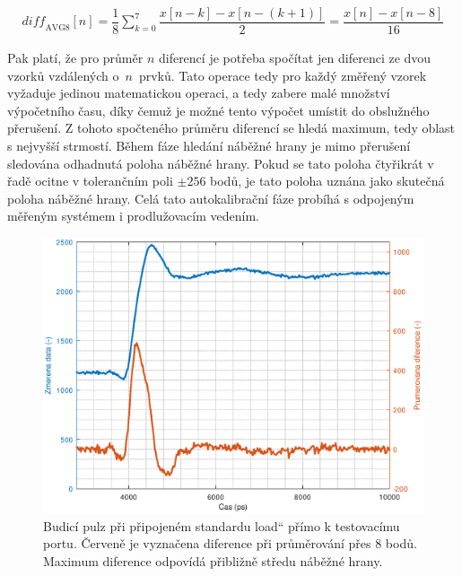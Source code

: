 \begin{equation}
\begin{gathered}
	\mathit{diff}_{\mathrm{AVG8}}[n]= \dfrac{1}{8} \sum_{k=0}^7 \dfrac{x[n-k]-x[n-(k+1)]}{2}= \dfrac{x[n]-x[n-8]}{16}
\end{gathered}
\label{equation_difference_sum}
\end{equation}

Pak platí, že pro průměr $n$ diferencí je potřeba spočítat jen diferenci ze dvou vzorků vzdálených o~$n$~prvků. Tato operace tedy pro každý změřený vzorek vyžaduje jedinou matematickou operaci, a tedy zabere malé množství výpočetního času, díky čemuž je možné tento výpočet umístit do obslužného přerušení. Z tohoto spočteného průměru diferencí se hledá maximum, tedy oblast s nejvyšší strmostí. Během fáze hledání náběžné hrany je mimo přerušení sledována odhadnutá poloha náběžné hrany. Pokud se tato poloha čtyřikrát v řadě ocitne v tolerančním poli $\pm256$ bodů, je tato poloha uznána jako skutečná poloha náběžné hrany. Celá tato autokalibrační fáze probíhá s odpojeným měřeným systémem i prodlužovacím vedením. 

\begin{figure}[H]
\includegraphics[width=\textwidth,keepaspectratio]{images/rising_edge_port_load.eps}\caption{Budicí pulz při připojeném standardu \quotedblbase load\textquotedblleft{} přímo k testovacímu portu. Červeně je vyznačena diference při průměrování přes 8 bodů. Maximum diference odpovídá přibližně středu náběžné hrany.}\label{rising_edge_port_load}
\end{figure}

